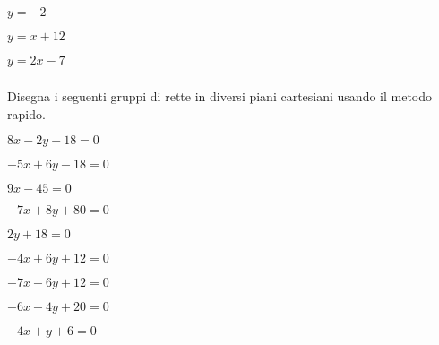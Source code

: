 \begin{esercizio}\label{ese:}
 \begin{multicols}{3}
 \begin{enumeratea}
  \item  $y = -2$
  \item  $y = x +12$
  \item  $y = 2x -7$
 \end{enumeratea}
 \end{multicols}
\end{esercizio}

\newpage
\subsubsection*{}

Disegna i seguenti gruppi di rette in diversi 
piani cartesiani usando il metodo rapido.

\begin{esercizio}\label{ese:}
 \begin{multicols}{3}
 \begin{enumeratea}
  \item  $8 x - 2 y - 18 = 0$
  \item  $-5 x + 6 y - 18 = 0$
  \item  $9 x - 45 = 0$
 \end{enumeratea}
 \end{multicols}
\end{esercizio}

\begin{esercizio}\label{ese:}
 \begin{multicols}{3}
 \begin{enumeratea}
  \item  $-7 x + 8 y + 80 = 0$
  \item  $2 y + 18 = 0$
  \item  $-4 x + 6 y + 12 = 0$
 \end{enumeratea}
 \end{multicols}
\end{esercizio}

\begin{esercizio}\label{ese:}
 \begin{multicols}{3}
 \begin{enumeratea}
  \item  $-7 x - 6 y + 12 = 0$
  \item  $-6 x - 4 y + 20 = 0$
  \item  $-4 x + y + 6 = 0$
 \end{enumeratea}
 \end{multicols}
\end{esercizio}

